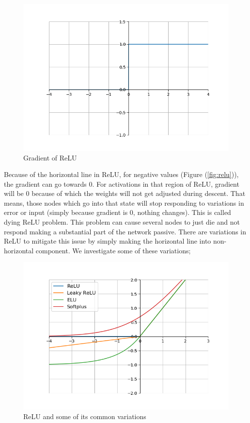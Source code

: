 \documentclass[12pt]{report}
\numberwithin{equation}{section}
\begin{document}
\begin{figure}[htb!]
\centering 
\includegraphics[scale=0.9]{png/relu_prime.png} 
\caption{Gradient of ReLU}
\label{fig:relu_prime}
\end{figure}
Because of the horizontal line in ReLU, for negative values (Figure (\ref{fig:relu})), the gradient can go towards $0$. For activations in that region of ReLU, gradient will be $0$ because of which the weights will not get adjusted during descent. That means, those nodes which go into that state will stop responding to variations in error or input (simply because gradient is $0$, nothing changes). This is called  {dying ReLU problem}. This problem can cause several nodes to just die and not respond making a substantial part of the network passive. There are variations in ReLU to mitigate this issue by simply making the horizontal line into non-horizontal component. We investigate some of these variations;
\begin{figure}[htb!]
\centering 
\includegraphics[scale=0.9]{png/compare.png} 
\caption{ReLU and some of its common variations}
\label{fig:compare}
\end{figure}
\end{document}
